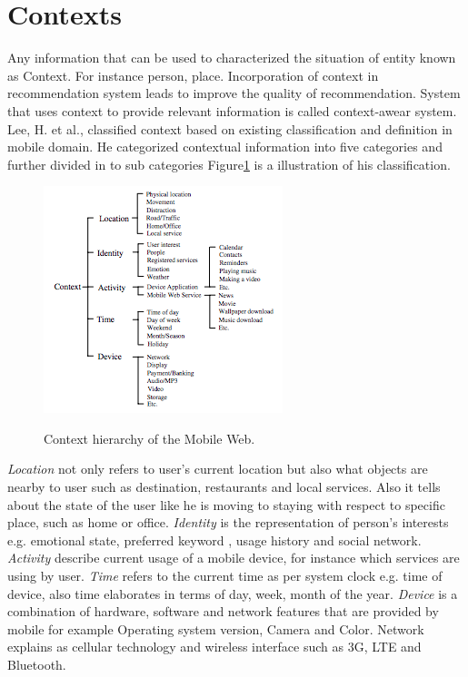 \section{Contexts}

Any information that can be used to characterized the situation of entity known as Context. For instance person, place\cite{ abowd1999towards}.  Incorporation of context in recommendation system leads to improve the quality of recommendation. System that uses context to provide relevant information is called context-awear system.  Lee, H. et al., \cite{lee2005context} classified context based on existing classification and definition in mobile domain. He categorized contextual information into five categories and further divided in to sub categories Figure\ref{fig:ch2_lee2005context} is a illustration of his classification.\newline 

\begin{figure}[h]
	\centering
	\includegraphics[width=.55\linewidth]{figures/ch2_lee2005context.png}
	\caption{Context hierarchy of the Mobile Web.} 
	\cite{lee2005context}
	\label{fig:ch2_lee2005context}
\end{figure}

\textit{Location} not only refers to user’s current location but also what objects are nearby to user such as destination, restaurants and local services. Also it tells about the state of the user like he is moving to staying with respect to specific place, such as home or office. \textit{Identity} is the representation of person’s interests e.g. emotional state, preferred keyword , usage history and social network. \textit{Activity} describe current usage of a mobile device,  for instance which services are using by user. \textit {Time} refers to  the current time as per system clock e.g. time of device, also time elaborates in terms of day, week, month of the year. \textit{Device} is a combination of hardware, software and network features that are provided by mobile for example Operating system version, Camera and Color.  Network explains as cellular technology and wireless interface such as 3G, LTE and Bluetooth.\newline
	
